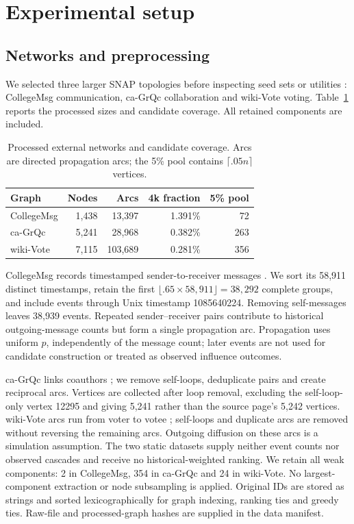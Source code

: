 \documentclass[smallextended]{svjour3}
\begin{document}
\section{Experimental setup}\label{sec:experimental-setup}
\subsection{Networks and preprocessing}
We selected three larger SNAP topologies before inspecting seed sets or utilities \cite{snap}: CollegeMsg communication, ca-GrQc collaboration and wiki-Vote voting. Table~\ref{tab:data} reports the processed sizes and candidate coverage. All retained components are included.
\begin{table}[htbp]
\caption{Processed external networks and candidate coverage. Arcs are directed propagation arcs; the 5\% pool contains $\lceil .05n\rceil$ vertices.}\label{tab:data}
\begin{tabular}{lrrrr}
\toprule
Graph & Nodes & Arcs & 4k fraction & 5\% pool \\
\midrule
CollegeMsg & 1,438 & 13,397 & 1.391\% & 72 \\
ca-GrQc & 5,241 & 28,968 & 0.382\% & 263 \\
wiki-Vote & 7,115 & 103,689 & 0.281\% & 356 \\
\bottomrule
\end{tabular}
\end{table}

CollegeMsg records timestamped sender-to-receiver messages \cite{college}. We sort its 58,911 distinct timestamps, retain the first $\lfloor .65\times58,911\rfloor=38,292$ complete groups, and include events through Unix timestamp 1085640224. Removing self-messages leaves 38,939 events. Repeated sender--receiver pairs contribute to historical outgoing-message counts but form a single propagation arc. Propagation uses uniform $p$, independently of the message count; later events are not used for candidate construction or treated as observed influence outcomes.

ca-GrQc links coauthors \cite{grqc}; we remove self-loops, deduplicate pairs and create reciprocal arcs. Vertices are collected after loop removal, excluding the self-loop-only vertex 12295 and giving 5,241 rather than the source page's 5,242 vertices. wiki-Vote arcs run from voter to votee \cite{signed,links}; self-loops and duplicate arcs are removed without reversing the remaining arcs. Outgoing diffusion on these arcs is a simulation assumption. The two static datasets supply neither event counts nor observed cascades and receive no historical-weighted ranking. We retain all weak components: 2 in CollegeMsg, 354 in ca-GrQc and 24 in wiki-Vote. No largest-component extraction or node subsampling is applied. Original IDs are stored as strings and sorted lexicographically for graph indexing, ranking ties and greedy ties. Raw-file and processed-graph hashes are supplied in the data manifest.
\end{document}
